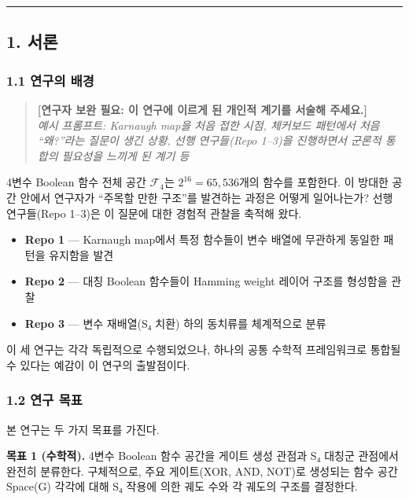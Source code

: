 \documentclass[
]{article}
\providecommand{\tightlist}{%
  \setlength{\itemsep}{0pt}\setlength{\parskip}{0pt}}
\begin{document}
\begin{center}\rule{0.5\linewidth}{0.5pt}\end{center}

\subsection{1. 서론}\label{uxc11cuxb860}

\subsubsection{1.1 연구의 배경}\label{uxc5f0uxad6cuxc758-uxbc30uxacbd}

\begin{quote}
\textbf{{[}연구자 보완 필요: 이 연구에 이르게 된 개인적 계기를 서술해
주세요.{]}}\\
\emph{예시 프롬프트: Karnaugh map을 처음 접한 시점, 체커보드 패턴에서
처음 ``왜?''라는 질문이 생긴 상황, 선행 연구들(Repo 1--3)을 진행하면서
군론적 통합의 필요성을 느끼게 된 계기 등}
\end{quote}

4변수 Boolean 함수 전체 공간 \(\mathcal{F}_4\)는
\(2^{16} = 65{,}536\)개의 함수를 포함한다. 이 방대한 공간 안에서
연구자가 ``주목할 만한 구조''를 발견하는 과정은 어떻게 일어나는가? 선행
연구들(Repo 1--3)은 이 질문에 대한 경험적 관찰을 축적해 왔다.

\begin{itemize}
\tightlist
\item
  \textbf{Repo 1} --- Karnaugh map에서 특정 함수들이 변수 배열에
  무관하게 동일한 패턴을 유지함을 발견
\item
  \textbf{Repo 2} --- 대칭 Boolean 함수들이 Hamming weight 레이어 구조를
  형성함을 관찰
\item
  \textbf{Repo 3} --- 변수 재배열(S₄ 치환) 하의 동치류를 체계적으로 분류
\end{itemize}

이 세 연구는 각각 독립적으로 수행되었으나, 하나의 공통 수학적
프레임워크로 통합될 수 있다는 예감이 이 연구의 출발점이다.

\subsubsection{1.2 연구 목표}\label{uxc5f0uxad6c-uxbaa9uxd45c}

본 연구는 두 가지 목표를 가진다.

\textbf{목표 1 (수학적).} 4변수 Boolean 함수 공간을 게이트 생성 관점과
S₄ 대칭군 관점에서 완전히 분류한다. 구체적으로, 주요 게이트(XOR, AND,
NOT)로 생성되는 함수 공간 Space(G) 각각에 대해 S₄ 작용에 의한 궤도 수와
각 궤도의 구조를 결정한다.
\end{document}
